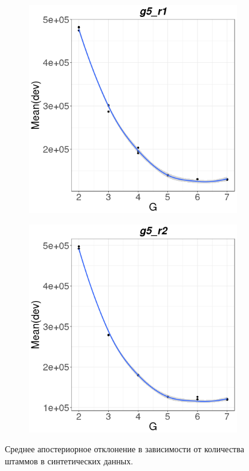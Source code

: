 \documentclass{spbau-diploma}
\begin{document}
\begin{figure}
    \hfill
      
   \begin{subfigure}[b]{0.4\textwidth}
        \includegraphics[width=\textwidth]{pics/devs/g5_r1.png}
    \end{subfigure}
    \qquad
    \begin{subfigure}[b]{0.4\textwidth}
        \includegraphics[width=\textwidth]{pics/devs/g5_r2.png}
    \end{subfigure}
    
    \caption{Среднее апостериорное отклонение в зависимости от количества штаммов в синтетических данных.}
    \label{fig:sim_dev}
\end{figure}
\end{document}
